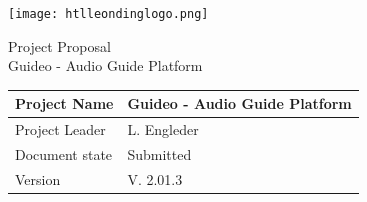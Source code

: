 \documentclass[12pt]{article}
\theoremstyle{definition}
\newcommand{\productname}{Guideo - Audio Guide Platform}
\newcommand{\projectleader}{L. Engleder}
\newcommand{\documentstatus}{Submitted}
\newcommand{\version}{V. 2.01.3}
\begin{document}
\begin{titlepage}
\begin{flushright}
\texttt{[image: htlleondinglogo.png]}\\
\end{flushright}
 
\vspace{10em}
 
\begin{center}
{\Huge Project Proposal} \\[3em]
{\LARGE \productname} \\[3em]
\end{center}
 
\begin{flushleft}
\begin{tabular}{|l|l|}
\hline
Project Name & \productname \\ \hline
Project Leader & \projectleader \\ \hline
Document state & \documentstatus \\ \hline
Version & \version \\ \hline
\end{tabular}
\end{flushleft}
 
\end{titlepage}
\end{document}
